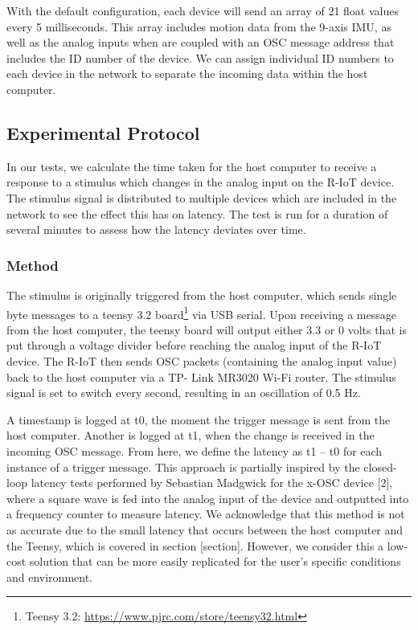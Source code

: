 With the default configuration, each device will send an array of 21 float values every 5 milliseconds. This array includes motion data from the 9-axis IMU, as well as the analog inputs when are coupled with an OSC message address that includes the ID number of the device. We can assign individual ID numbers to each device in the network to separate the incoming data within the host computer.

\subsection{Experimental Protocol}

In our tests, we calculate the time taken for the host computer to receive a response to a stimulus which changes in the analog input on the R-IoT device. The stimulus signal is distributed to multiple devices which are included in the network to see the effect this has on latency. The test is run for a duration of several minutes to assess how the latency deviates over time.

\subsubsection{Method}

The stimulus is originally triggered from the host computer, which sends single byte messages to a teensy 3.2 board\footnote{Teensy 3.2: \url{https://www.pjrc.com/store/teensy32.html}} via USB serial. Upon receiving a message from the host computer, the teensy board will output either 3.3 or 0 volts that is put through a voltage divider before reaching the analog input of the R-IoT device. The R-IoT then sends OSC packets (containing the analog input value) back to the host computer via a TP- Link MR3020 Wi-Fi router. The stimulus signal is set to switch every second, resulting in an oscillation of 0.5 Hz.


A timestamp is logged at t0, the moment the trigger message is sent from the host computer. Another is logged at t1, when the change is received in the incoming OSC message. From here, we define the latency as t1 – t0 for each instance of a trigger message.
This approach is partially inspired by the closed-loop latency tests performed by Sebastian Madgwick for the x-OSC device [2], where a square wave is fed into the analog input of the device and outputted into a frequency counter to measure latency. We acknowledge that this method is not as accurate due to the small latency that occurs between the host computer and the Teensy, which is covered in section [section]. However, we consider this a low-cost solution that can be more easily replicated for the user’s specific conditions and environment.

